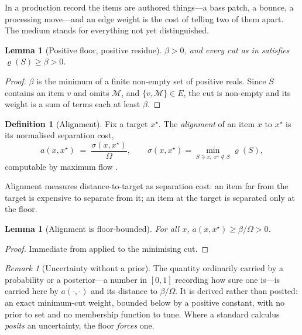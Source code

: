 \documentclass[11pt,twocolumn,a4paper]{article}
\newtheorem{lemma}[theorem]{Lemma}
\theoremstyle{definition}
\newtheorem{definition}[theorem]{Definition}
\theoremstyle{remark}
\newtheorem{remark}[theorem]{Remark}
\newcommand{\flo}{\beta}
\newcommand{\med}{\mathcal{M}}
\newcommand{\res}{\varrho}
\newcommand{\aln}{\sigma}
\newcommand{\Om}{\Omega}
\begin{document}
In a production record the items are authored things---a bass patch, a bounce, a
processing move---and an edge weight is the cost of telling two of them apart. The
medium stands for everything not yet distinguished.

\begin{lemma}[Positive floor, positive residue]
\label{lem:floor}
$\flo>0$, and every cut as in  satisfies $\res(S)\ge\flo>0$.
\end{lemma}

\begin{proof}
$\flo$ is the minimum of a finite non-empty set of positive reals. Since $S$
contains an item $v$ and omits $\med$, and $\{v,\med\}\in E$, the cut is
non-empty and its weight is a sum of terms each at least $\flo$.
\end{proof}

\begin{definition}[Alignment]
\label{def:alignment}
Fix a target $x^{\star}$. The \emph{alignment} of an item $x$ to $x^{\star}$ is
its normalised separation cost,
\[
  a(x,x^{\star}) \;=\; \frac{\aln(x,x^{\star})}{\Om},
  \qquad
  \aln(x,x^{\star}) = \min_{S\ni x,\ x^{\star}\notin S}\res(S),
\]
computable by maximum flow \citep{ford1956maximal,edmonds1972theoretical}.
\end{definition}

Alignment measures distance-to-target as separation cost: an item far from the
target is expensive to separate from it; an item at the target is separated only
at the floor.

\begin{lemma}[Alignment is floor-bounded]
\label{lem:alignfloor}
For all $x$, $a(x,x^{\star})\ge\flo/\Om>0$.
\end{lemma}

\begin{proof}
Immediate from  applied to the minimising cut.
\end{proof}

\begin{remark}[Uncertainty without a prior]
\label{rem:no-prior}
The quantity ordinarily carried by a probability or a posterior---a number in
$[0,1]$ recording how sure one is---is carried here by $a(\cdot,\cdot)$ and its
distance to $\flo/\Om$. It is derived rather than posited: an exact
minimum-cut weight, bounded below by a positive constant, with no prior to set
and no membership function to tune. Where a standard calculus \emph{posits} an
uncertainty, the floor \emph{forces} one.
\end{remark}
\end{document}
